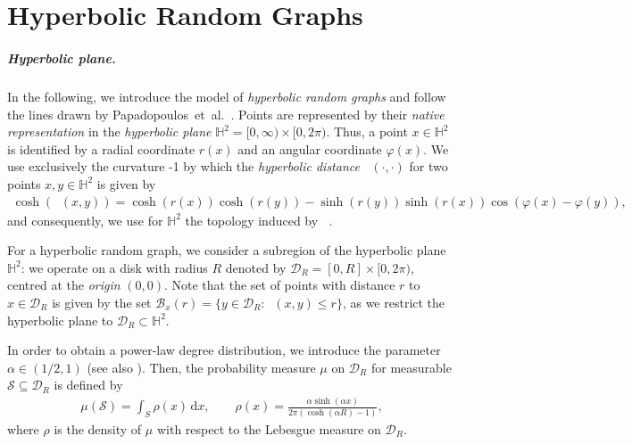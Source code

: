 \documentclass[letterpaper,11pt]{article}
\newcommand{\dd}{\,\mathrm d}
\newcommand{\B}{\mathcal B}
\newcommand{\Hb}{\ensuremath{\mathbb H^2}\xspace}
\newcommand{\bH}{\Hb}
\newcommand{\disk}{\ensuremath{\mathcal D_R}\xspace}
\newcommand{\1}{\mathbb I}
\DeclareMathOperator{\dist}{d_h}
\newcommand{\func}{\rho}
\begin{document}
\section{Hyperbolic Random Graphs}\label{sec:prelims}
%
\subparagraph{Hyperbolic plane.}
In the following, we introduce the model of \emph{hyperbolic random graphs} and follow the lines drawn by Papadopoulos~et~al.~\cite{pkbv-info-2010}. Points are represented by their \emph{native representation} in the \emph{hyperbolic plane} $\bH = [0, \infty) \times[0,2\pi)$. Thus, a point $x \in \bH$ is identified by a radial coordinate $r(x)$ and an angular coordinate $\varphi(x)$. We use exclusively the curvature -1 by which the \emph{hyperbolic distance} $\dist(\cdot,\cdot)$ for two points $x,y \in \bH$ is given by
\begin{align}\label{eq:hyperbolic_distance}
    \cosh(\dist(x,y)) = \cosh(r(x))\cosh(r(y)) - \sinh(r(y))\sinh(r(x))\cos(\varphi(x) - \varphi(y)),
\end{align}
and consequently, we use for \bH the topology induced by $\dist$.

For a hyperbolic random graph, we consider a subregion of the hyperbolic plane \Hb: we operate on a disk with radius $R$  denoted by \(\disk = [0,R] \times [0,2\pi)\), centred at the \emph{origin} \((0,0)\). Note that the set of points with distance $r$ to $x\in\disk$ is given by the set $\B_x(r) = \{y\in\disk : \dist(x,y)\leq r\}$, as we restrict the hyperbolic plane to $\disk\subset \Hb$. 

In order to obtain a power-law degree distribution, we introduce the parameter $\alpha \in (1/2, 1)$ (see also \cite{gpp-rhg-12, pkbv-info-2010}). Then, the probability measure $\mu$ on \disk for measurable $\mathcal S\subseteq \disk$ is defined by
\begin{align*}
	\mu(\mathcal S) = \int_S \func(x) \dd x, 
    \qquad \func(x) = \frac{\alpha\sinh(\alpha x)}{2\pi(\cosh(\alpha R) - 1)}, 
\end{align*}
where $\rho$ is the density of $\mu$ with respect to the Lebesgue measure on \disk. 
\end{document}
